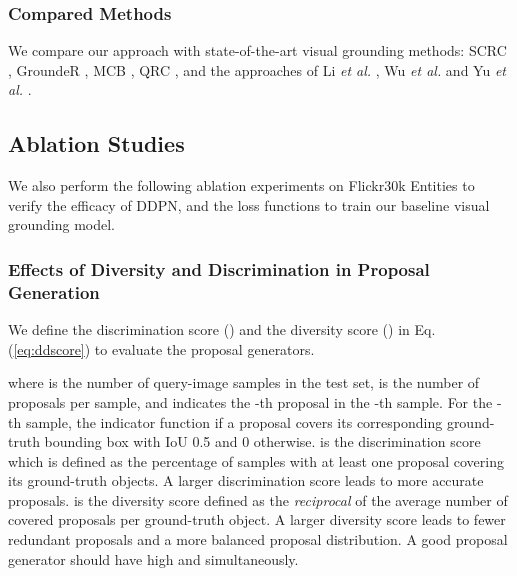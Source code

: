 \documentclass{article}
\begin{document}
\subsubsection{Compared Methods}
We compare our approach with state-of-the-art visual grounding methods: SCRC \cite{hu2016natural}, GroundeR \cite{rohrbach2016grounding}, MCB \cite{fukui2016multimodal}, QRC \cite{chen2017query}, and the approaches of Li \emph{et al.} \cite{li2017deep}, Wu \emph{et al.} \cite{wu2017end} and Yu \emph{et al.} \cite{yu2017joint}.


\subsection{Ablation Studies}
We also perform the following ablation experiments on Flickr30k Entities to verify the efficacy of DDPN, and the loss functions to train our baseline visual grounding model.

\subsubsection{Effects of Diversity and Discrimination in Proposal Generation}

We define the {discrimination} score () and the {diversity} score () in Eq.(\ref{eq:ddscore}) to evaluate the proposal generators.


where  is the number of query-image samples in the test set,  is the number of proposals per sample, and  indicates the -th proposal in the -th sample. For the -th sample, the indicator function  if a proposal  covers its corresponding ground-truth bounding box  with IoU  0.5 and 0 otherwise.  is the discrimination score which is defined as the percentage of samples with at least one proposal covering its ground-truth objects. A larger discrimination score leads to more accurate proposals.  is the diversity score defined as the \emph{reciprocal} of the average number of covered proposals per ground-truth object. A larger diversity score leads to fewer redundant proposals and a more balanced proposal distribution. A good proposal generator should have high  and  simultaneously.
\end{document}
